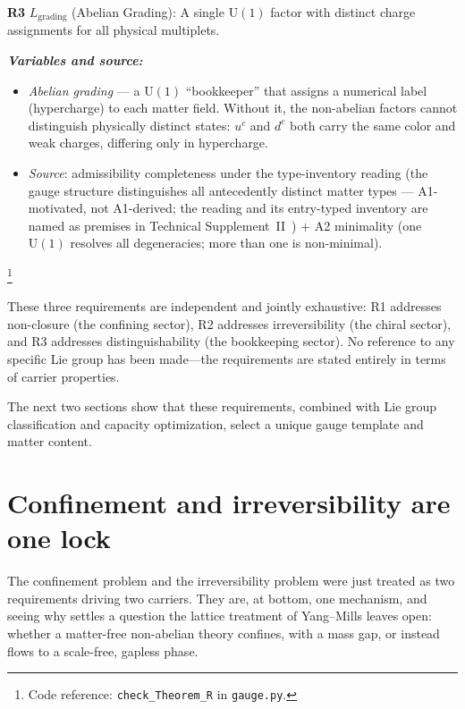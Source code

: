\documentclass[11pt]{article}
\newenvironment{varlist}{\begin{itemize}[nosep,leftmargin=2em]}{\end{itemize}}
\newcommand{\coderef}[2]{\footnote{Code reference: \texttt{#1} in \texttt{#2}.}}
\newcommand{\U}{\mathrm{U}}
\begin{document}
\begin{tcolorbox}[apfbox, title={Theorem R: Representation Requirements from Admissibility}]
\medskip
\textbf{R3} $L_{\mathrm{grading}}$ (Abelian Grading): A single $\U(1)$ factor with distinct charge assignments for all physical multiplets.

\smallskip\noindent\textbf{\textit{Variables and source:}}
\begin{varlist}
\item \textit{Abelian grading} --- a $\U(1)$ ``bookkeeper'' that assigns a numerical label (hypercharge) to each matter field.  Without it, the non-abelian factors cannot distinguish physically distinct states: $u^c$ and $d^c$ both carry the same color and weak charges, differing only in hypercharge.
\item \textit{Source}: admissibility completeness under the type-inventory reading (the gauge structure distinguishes all antecedently distinct matter types --- A1-motivated, not A1-derived; the reading and its entry-typed inventory are named as premises in Technical Supplement~II~\cite{BrookeP2FoundSupplement}) $+$ A2 minimality (one $\U(1)$ resolves all degeneracies; more than one is non-minimal).
\end{varlist}
\coderef{check\_Theorem\_R}{gauge.py}
\end{tcolorbox}


These three requirements are independent and jointly exhaustive: R1 addresses non-closure (the confining sector), R2 addresses irreversibility (the chiral sector), and R3 addresses distinguishability (the bookkeeping sector).  No reference to any specific Lie group has been made---the requirements are stated entirely in terms of carrier properties.

The next two sections show that these requirements, combined with Lie group classification and capacity optimization, select a unique gauge template and matter content.



\section{Confinement and irreversibility are one lock}
\label{sec:record_locking}

The confinement problem and the irreversibility problem were just treated as two requirements driving two carriers.  They are, at bottom, one mechanism, and seeing why settles a question the lattice treatment of Yang--Mills leaves open: whether a matter-free non-abelian theory confines, with a mass gap, or instead flows to a scale-free, gapless phase.
\end{document}
